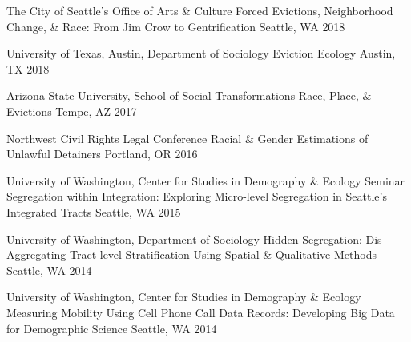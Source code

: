 \begin{cventries}
  \cventry
    {The City of Seattle’s Office of Arts \& Culture} %
    {Forced Evictions, Neighborhood Change, \& Race: From Jim Crow to Gentrification} %
    {Seattle, WA} %
    {2018} %
    {}

  \cventry
    {University of Texas, Austin, Department of Sociology} %
    {Eviction Ecology} %
    {Austin, TX} %
    {2018} %
    {}

  \cventry
    {Arizona State University, School of Social Transformations} %
    {Race, Place, \& Evictions} %
    {Tempe, AZ} %
    {2017} %
    {}

  \cventry
    {Northwest Civil Rights Legal Conference} %
    {Racial \& Gender Estimations of Unlawful Detainers} %
    {Portland, OR} %
    {2016} %
    {}
    
    
  \cventry
    {University of Washington, Center for Studies in Demography \& Ecology Seminar} %
    {Segregation within Integration: Exploring Micro-level Segregation in Seattle's Integrated Tracts} %
    {Seattle, WA} %
    {2015} %
    {}
    
  \cventry
    {University of Washington, Department of Sociology} %
    {Hidden Segregation: Dis-Aggregating Tract-level Stratification Using Spatial \& Qualitative Methods} %
    {Seattle, WA} %
    {2014} %
    {}
    
  \cventry
    {University of Washington, Center for Studies in Demography \& Ecology} %
    {Measuring Mobility Using Cell Phone Call Data Records: Developing Big Data for Demographic Science} %
    {Seattle, WA} %
    {2014} %
    {}
    
    

\end{cventries}
